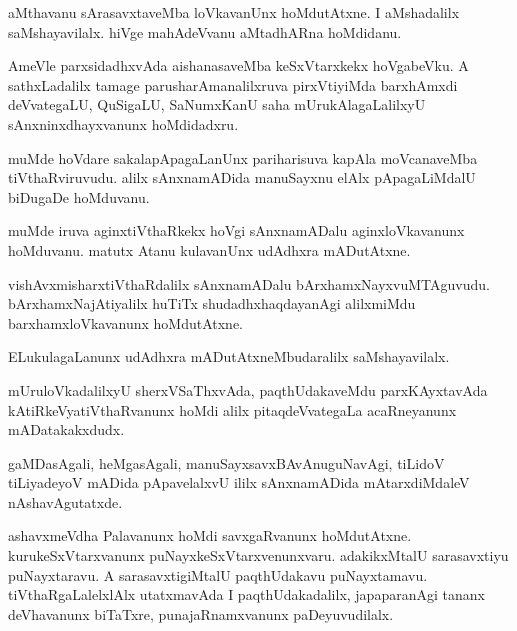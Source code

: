 \documentclass{article}
\begin{document}
\begin{mn}
aMthavanu sArasavxtaveMba loVkavanUnx hoMdutAtxne. I aMshadalilx saMshayavilalx. hiVge mahAdeVvanu 
aMtadhARna hoMdidanu.
\end{mn}

\begin{mn}
AmeVle parxsidadhxvAda aishanasaveMba keSxVtarxkekx hoVgabeVku. A sathxLadalilx tamage 
parusharAmanalilxruva pirxVtiyiMda barxhAmxdi deVvategaLU, QuSigaLU, SaNumxKanU saha 
mUrukAlagaLalilxyU sAnxninxdhayxvanunx hoMdidadxru.
\end{mn}

\begin{mn}
muMde hoVdare sakalapApagaLanUnx pariharisuva kapAla moVcanaveMba tiVthaRviruvudu. alilx 
sAnxnamADida manuSayxnu elAlx pApagaLiMdalU biDugaDe hoMduvanu.
\end{mn}

\begin{mn}
muMde iruva aginxtiVthaRkekx hoVgi sAnxnamADalu aginxloVkavanunx hoMduvanu. matutx Atanu 
kulavanUnx udAdhxra mADutAtxne.
\end{mn}

\begin{mn}
vishAvxmisharxtiVthaRdalilx sAnxnamADalu bArxhamxNayxvuMTAguvudu. bArxhamxNajAtiyalilx huTiTx 
shudadhxhaqdayanAgi alilxmiMdu barxhamxloVkavanunx hoMdutAtxne.
\end{mn}

\begin{mn}
ELukulagaLanunx udAdhxra mADutAtxneMbudaralilx saMshayavilalx.
\end{mn}

\begin{mn}
mUruloVkadalilxyU sherxVSaThxvAda, paqthUdakaveMdu parxKAyxtavAda kAtiRkeVyatiVthaRvanunx hoMdi 
alilx pitaqdeVvategaLa acaRneyanunx mADatakakxdudx.
\end{mn}

\begin{mn}
gaMDasAgali, heMgasAgali, manuSayxsavxBAvAnuguNavAgi, tiLidoV tiLiyadeyoV mADida pApavelalxvU 
ililx sAnxnamADida mAtarxdiMdaleV nAshavAgutatxde.
\end{mn}

\begin{mn}
ashavxmeVdha Palavanunx hoMdi savxgaRvanunx hoMdutAtxne. kurukeSxVtarxvanunx 
puNayxkeSxVtarxvenunxvaru. adakikxMtalU sarasavxtiyu puNayxtaravu. A sarasavxtigiMtalU 
paqthUdakavu puNayxtamavu. tiVthaRgaLalelxlAlx utatxmavAda I paqthUdakadalilx, japaparanAgi tananx
deVhavanunx biTaTxre, punajaRnamxvanunx paDeyuvudilalx.
\end{mn}
\end{document}
